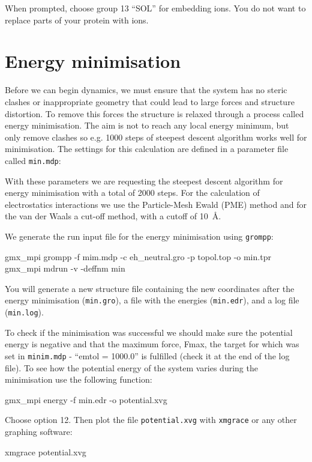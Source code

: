 \documentclass[10pt]{article}
\begin{document}
When prompted, choose group 13 ``SOL'' for embedding ions. You do not want to replace parts of your protein with ions.

\section{Energy minimisation}
Before we can begin dynamics, we must ensure that the system has no steric clashes or inappropriate geometry that could lead to large forces and structure distortion. To remove this forces the structure is relaxed through a process called energy minimisation. The aim is not to reach any local energy minimum, but only remove clashes so e.g. 1000 steps of steepest descent algorithm works well for minimisation. The settings for this calculation are defined in a parameter file called \texttt{min.mdp}:
 
With these parameters we are requesting the steepest descent algorithm for energy minimisation with a total of 2000 steps. For the calculation of electrostatics interactions we use the Particle-Mesh Ewald (PME) method and for the van der Waals a cut-off method, with a cutoff of 10~\r{A}.

We generate the run input file for the energy minimisation using \texttt{grompp}:

\begin{cmdline}
gmx_mpi grompp -f mim.mdp -c eh_neutral.gro -p topol.top -o min.tpr
gmx_mpi mdrun -v -deffnm min
\end{cmdline}

You will generate a new structure file containing the new coordinates after the energy minimisation (\texttt{min.gro}), a file with the energies (\texttt{min.edr}), and a log file (\texttt{min.log}). 

To check if the minimisation was successful we should make sure the potential energy is negative and that the maximum force, Fmax, the target for which was set in \texttt{minim.mdp} - ``emtol = 1000.0'' is fulfilled (check it at the end of the log file). To see how the potential energy of the system varies during the minimisation use the following function:

\begin{cmdline}
gmx_mpi energy -f min.edr -o potential.xvg
\end{cmdline}

Choose option 12. Then plot the file \texttt{potential.xvg} with \texttt{xmgrace} or any other graphing software:

\begin{cmdline}
xmgrace potential.xvg
\end{cmdline}
\end{document}
